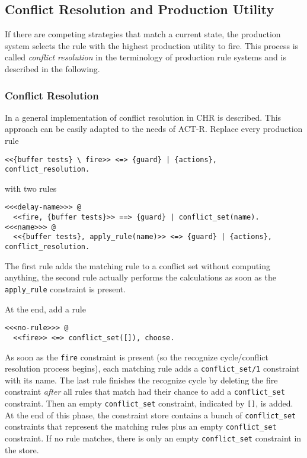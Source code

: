 \subsection{Conflict Resolution and Production Utility}

If there are competing strategies that match a current state, the production system selects the rule with the highest production utility to fire. This process is called \emph{conflict resolution} in the terminology of production rule systems and is described in the following.

\subsubsection{Conflict Resolution}
\label{implementation:conflict_resolution}

In \cite[151\psqq]{fru_chr_book_2009} a general implementation of conflict resolution in CHR is described. This approach can be easily adapted to the needs of ACT-R. Replace every production rule

\begin{lstlisting}
<<{buffer tests} \ fire>> <=> {guard} | {actions}, conflict_resolution.
\end{lstlisting}

with two rules

\begin{lstlisting}[caption={Translation scheme for production rules regarding conflict resolution}, label=lst:conflict_resolution_scheme]
<<<delay-name>>> @
  <<fire, {buffer tests}>> ==> {guard} | conflict_set(name).
<<<name>>> @
  <<{buffer tests}, apply_rule(name)>> <=> {guard} | {actions}, conflict_resolution.
\end{lstlisting}

The first rule adds the matching rule to a conflict set without computing anything, the second rule actually performs the calculations as soon as the \lstinline|apply_rule| constraint is present.

At the end, add a rule

\begin{lstlisting}
<<<no-rule>>> @
  <<fire>> <=> conflict_set([]), choose.
\end{lstlisting}

As soon as the \lstinline|fire| constraint is present (so the recognize cycle/conflict resolution process begins), each matching rule adds a \lstinline|conflict_set/1| constraint with its name. The last rule finishes the recognize cycle by deleting the fire constraint \emph{after} all rules that match had their chance to add a \lstinline|conflict_set| constraint. Then an empty \lstinline|conflict_set| constraint, indicated by \lstinline|[]|, is added. At the end of this phase, the constraint store contains a bunch of \lstinline|conflict_set| constraints that represent the matching rules plus an empty \lstinline|conflict_set| constraint. If no rule matches, there is only an empty \lstinline|conflict_set| constraint in the store.

